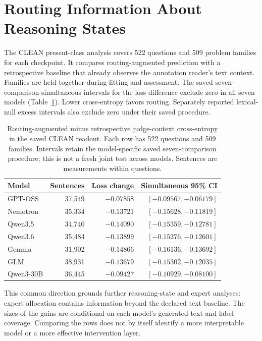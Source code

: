 \section{Routing Information About Reasoning States}
\label{sec:routing-information}

The CLEAN present-class analysis covers 522 questions and 509 problem
families for each checkpoint. It compares routing-augmented prediction
with a retrospective baseline that already observes the annotation
reader's text context. Families are held together during fitting and
assessment. The saved seven-comparison simultaneous intervals for the
loss difference exclude zero in all seven models
(Table~\ref{tab:analysis-readout}). Lower cross-entropy favors routing.
Separately reported lexical-null excess intervals also exclude zero under
their saved procedure.

\begin{table}[t]
\centering\small
\begin{tabular}{lrrr}
\toprule
Model & Sentences & Loss change & Simultaneous 95\% CI \\
\midrule
GPT-OSS & 37,549 & $-0.07858$ & $[-0.09567,-0.06179]$ \\
Nemotron & 35,334 & $-0.13721$ & $[-0.15628,-0.11819]$ \\
Qwen3.5 & 34,740 & $-0.14090$ & $[-0.15359,-0.12781]$ \\
Qwen3.6 & 35,484 & $-0.13899$ & $[-0.15276,-0.12601]$ \\
Gemma & 31,902 & $-0.14866$ & $[-0.16136,-0.13692]$ \\
GLM & 38,931 & $-0.13679$ & $[-0.15302,-0.12035]$ \\
Qwen3-30B & 36,445 & $-0.09427$ & $[-0.10929,-0.08100]$ \\
\bottomrule
\end{tabular}
\caption{Routing-augmented minus retrospective judge-context
cross-entropy in the saved CLEAN readout. Each row has 522 questions and
509 families. Intervals retain the model-specific saved seven-comparison
procedure; this is not a fresh joint test across models. Sentences are
measurements within questions.}
\label{tab:analysis-readout}
\end{table}

This common direction grounds further reasoning-state and expert
analyses: expert allocation contains information beyond the declared text
baseline. The sizes of the gains are conditional on each model's generated
text and label coverage. Comparing the rows does not by itself identify a
more interpretable model or a more effective intervention layer.

